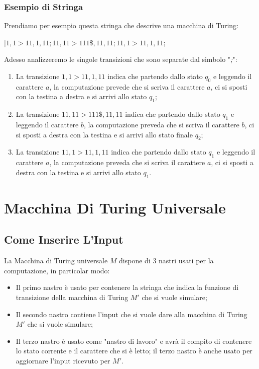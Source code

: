 \documentclass[a4paper,12pt,titlepage,oneside]{book}
\begin{document}
			\subsection{Esempio di Stringa}
			
Prendiamo per esempio questa stringa che descrive una macchina di Turing:

\begin{center}
	$|1,1>11,1,11;11,11>111\$,11,11;11,1>11,1,11;$
\end{center}

Adesso analizzeremo le singole transizioni che sono separate dal simbolo "\emph{;}":

\begin{enumerate}
	\item La transizione $1,1>11,1,11$ indica che partendo dallo stato $q_0$ e leggendo il carattere $a$, la computazione prevede che si scriva il carattere $a$, ci si sposti con la testina a destra e si arrivi allo stato $q_1$;
	\item La transizione $11,11>111\$,11,11$ indica che partendo dallo stato $q_1$ e leggendo il carattere $b$, la computazione preveda che si scriva il carattere $b$, ci si sposti a destra con la testina e si arrivi allo stato finale $q_2$; 
	\item La transizione $11,1>11,1,11$ indica che partendo dallo stato $q_1$ e leggendo il carattere $a$, la computazione preveda che si scriva il carattere $a$, ci si sposti a destra con la testina e si arrivi allo stato $q_1$.
\end{enumerate}

	\chapter{Macchina Di Turing Universale} \label{Capitolo 4}

		\section{Come Inserire L'Input}
		
La Macchina di Turing universale $M$ dispone di 3 nastri usati per la computazione, in particolar modo:

\begin{itemize}
	\item Il primo nastro è usato per contenere la stringa che indica la funzione di transizione della macchina di Turing $M'$ che si vuole simulare;
	\item Il secondo nastro contiene l'input che si vuole dare alla macchina di Turing $M'$ che si vuole simulare;
	\item Il terzo nastro è usato come "nastro di lavoro" e avrà il compito di contenere lo stato corrente e il carattere che si è letto; il terzo nastro è anche usato per aggiornare l'input ricevuto per $M'$.
\end{itemize}
\end{document}
